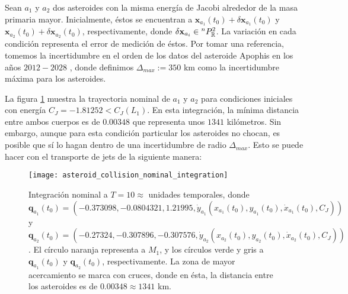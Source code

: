 


Sean $a_1$ y $a_2$ dos asteroides con la misma energía de Jacobi alrededor de la masa primaria mayor. Inicialmente, éstos se encuentran a $\mathbf{x}_{a_1}(t_0) + \delta\mathbf{x}_{a_1}(t_0)$  y $\mathbf{x}_{a_2}(t_0) + \delta\mathbf{x}_{a_2}(t_0)$, respectivamente, donde $\delta\mathbf{x}_{a_i} \in {^{n}P_{\mathbb{R}}^ 2 }$. La variación en cada condición representa el error de medición de éstos. Por tomar una referencia, tomemos la incertidumbre en el orden de los datos del asteroide Apophis en los años $2012 - 2028$ \cite{Desmars2013}, donde definimos $\Delta_{max} := 350 $ km como la incertidumbre máxima para los asteroides.

La figura \ref{fig:asteroid_collision_nominal_integration} muestra la trayectoria nominal de $a_1$ y $a_2$ para condiciones iniciales con energía $C_J = -1.81252 < C_J(L_1)$. En esta integración, la mínima distancia entre ambos cuerpos es de $0.00348$ que representa unos $1341$ kilómetros. Sin embargo, aunque para esta condición particular los asteroides no chocan, es posible que sí lo hagan dentro de una incertidumbre de radio $\Delta_{max}$. Esto se puede hacer con el transporte de jets de la siguiente manera: 

\begin{figure}
 \centering
 \texttt{[image: asteroid\_collision\_nominal\_integration]}
 \caption{Integración nominal a $T=10 \approx $ unidades temporales, donde $\mathbf{q}_{a_1}(t_0) = \left( -0.373098, -0.0804321, 1.21995, \dot{y}_{a_1} \left( x_{a_1}(t_0), y_{a_1}(t_0), \dot{x}_{a_1}(t_0), C_J \right) \right)$ 
 y $\mathbf{q}_{a_2}(t_0) = \left( -0.27324, -0.307896, -0.307576, \dot{y}_{a_2} \left( x_{a_2}(t_0), y_{a_2}(t_0), \dot{x}_{a_2}(t_0), C_J \right) \right)$. El círculo naranja representa a $M_1$, y los círculos verde y gris a $\mathbf{q}_{a_1}(t_0)$ y $\mathbf{q}_{a_2}(t_0)$, respectivamente. La zona de mayor acercamiento se marca con cruces, donde en ésta, la distancia entre los asteroides es de $0.00348 \approx 1341$ km.}
 \label{fig:asteroid_collision_nominal_integration}
\end{figure}

